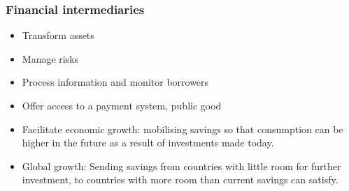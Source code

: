 \documentclass[11pt]{beamer}
\begin{document}
\begin{frame}
\frametitle{Financial intermediaries}
\begin{itemize}
\item Transform assets
\item Manage risks
\item Process information and monitor borrowers
\item Offer access to a payment system, public good
\end{itemize}


 \hfill \break
\begin{itemize}
\item Facilitate economic growth: mobilising savings so that consumption can be higher in the future as a result of investments made today.
\item Global growth: Sending savings from countries with little room for further investment, to countries with more room than current savings can
satisfy.
\end{itemize}
\end{frame}
\end{document}
